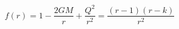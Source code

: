 \begin{equation}
f(r) = 1 - \frac{2GM}{r} + \frac{Q^2}{r^2} = \frac{(r-1)(r-k)}{r^2}
\end{equation}

